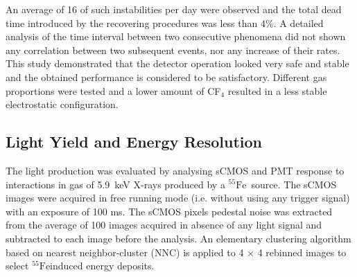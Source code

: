 \documentclass[physics,article,submit,moreauthors,pdftex]{Definitions/mdpi}
\newcommand{\fe}{\ensuremath{^{55}\textrm{Fe}}\xspace}
\begin{document}
An average of 16 of such instabilities per day were observed and the total dead time introduced by the recovering procedures was less than 4$\%$. A detailed analysis of the time interval between two consecutive phenomena did not shown any correlation between two subsequent events, nor any increase of their rates. This study demonstrated that the detector operation looked very safe and stable and the obtained performance is considered to be satisfactory. Different gas proportions were tested and a lower amount of CF$_4$ resulted in a less stable electrostatic configuration. 





\subsection{Light Yield and Energy Resolution}\label{sec:yield}

The light production was evaluated by analysing sCMOS and PMT response to interactions in gas of 5.9~keV X-rays produced by a \fe~source. The sCMOS images were acquired in free running mode (i.e. without using any trigger signal) with an exposure of 100 ms. The sCMOS pixels pedestal noise was extracted from the average of 100 images acquired in absence of any light signal and subtracted to each image before the analysis. An elementary clustering algorithm based on nearest neighbor-cluster (NNC) is applied to 4 $\times$ 4 rebinned images to select \fe\-induced energy deposits.
\end{document}

